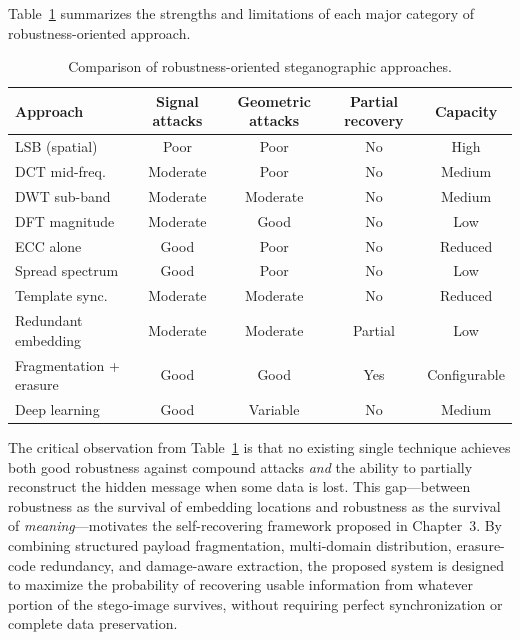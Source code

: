 \documentclass[12pt,a4paper,oneside]{report}
\begin{document}
	Table~\ref{tab:robustness_comparison} summarizes the strengths and limitations of each
	major category of robustness-oriented approach.
	
	\begin{table}[ht]
		\centering
		\caption{Comparison of robustness-oriented steganographic approaches.}
		\label{tab:robustness_comparison}
		\renewcommand{\arraystretch}{1.3}
		\begin{tabular}{lcccc}
			\hline
			\textbf{Approach} & \textbf{Signal attacks} & \textbf{Geometric attacks} & \textbf{Partial recovery} & \textbf{Capacity} \\
			\hline
			LSB (spatial)          & Poor     & Poor     & No  & High   \\
			DCT mid-freq.          & Moderate & Poor     & No  & Medium \\
			DWT sub-band           & Moderate & Moderate & No  & Medium \\
			DFT magnitude          & Moderate & Good     & No  & Low    \\
			ECC alone              & Good     & Poor     & No  & Reduced \\
			Spread spectrum        & Good     & Poor     & No  & Low    \\
			Template sync.         & Moderate & Moderate & No  & Reduced \\
			Redundant embedding    & Moderate & Moderate & Partial & Low \\
			Fragmentation + erasure& Good     & Good     & Yes & Configurable \\
			Deep learning          & Good     & Variable & No  & Medium \\
			\hline
		\end{tabular}
	\end{table}
	
	The critical observation from Table~\ref{tab:robustness_comparison} is that no existing
	single technique achieves both good robustness against compound attacks \emph{and}
	the ability to partially reconstruct the hidden message when some data is lost.
	This gap—between robustness as the survival of embedding locations and robustness as the
	survival of \emph{meaning}—motivates the self-recovering framework proposed in
	Chapter~3.
	By combining structured payload fragmentation, multi-domain distribution, erasure-code
	redundancy, and damage-aware extraction, the proposed system is designed to maximize
	the probability of recovering usable information from whatever portion of the stego-image
	survives, without requiring perfect synchronization or complete data preservation.
	
\end{document}
